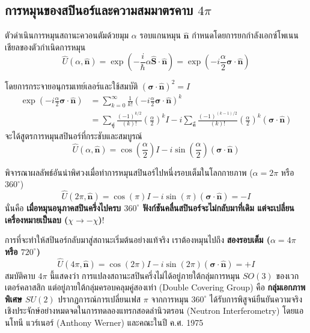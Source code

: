 \subsection{การหมุนของสปินอร์และความสมมาตรคาบ $4\pi$}
ตัวดำเนินการหมุนสถานะควอนตัมด้วยมุม $\alpha$ รอบแกนหมุน $\hat{\mathbf{n}}$ กำหนดโดยการยกกำลังเอกซ์โพเนนเชียลของตัวกำเนิดการหมุน
\begin{equation}
\hat{U}(\alpha, \hat{\mathbf{n}}) = \exp\left( -\frac{i}{\hbar} \alpha \hat{\mathbf{S}}\cdot\hat{\mathbf{n}} \right) = \exp\left( -i \frac{\alpha}{2} \boldsymbol{\sigma}\cdot\hat{\mathbf{n}} \right)
\end{equation}

โดยการกระจายอนุกรมเทย์เลอร์และใช้สมบัติ $(\boldsymbol{\sigma}\cdot\hat{\mathbf{n}})^2 = I$
\begin{align*}
\exp\left( -i \frac{\alpha}{2} \boldsymbol{\sigma}\cdot\hat{\mathbf{n}} \right) &= \sum_{k=0}^\infty \frac{1}{k!} \left( -i\frac{\alpha}{2} \boldsymbol{\sigma}\cdot\hat{\mathbf{n}} \right)^k \\
&= \sum_{\text{คู่}} \frac{(-1)^{k/2}}{(k)!} \left(\frac{\alpha}{2}\right)^k I - i \sum_{\text{คี่}} \frac{(-1)^{(k-1)/2}}{(k)!} \left(\frac{\alpha}{2}\right)^k (\boldsymbol{\sigma}\cdot\hat{\mathbf{n}})
\end{align*}
จะได้สูตรการหมุนสปินอร์ที่กระชับและสมบูรณ์
\begin{equation}
\hat{U}(\alpha, \hat{\mathbf{n}}) = \cos\left(\frac{\alpha}{2}\right) I - i \sin\left(\frac{\alpha}{2}\right) (\boldsymbol{\sigma}\cdot\hat{\mathbf{n}})
\label{eq:spinor_rotation_operator}
\end{equation}

พิจารณาผลลัพธ์อันน่าพิศวงเมื่อทำการหมุนสปินอร์ไปหนึ่งรอบเต็มในโลกกายภาพ ($\alpha = 2\pi$ หรือ $360^\circ$)
\begin{equation}
\hat{U}(2\pi, \hat{\mathbf{n}}) = \cos(\pi) I - i \sin(\pi) (\boldsymbol{\sigma}\cdot\hat{\mathbf{n}}) = -I
\end{equation}
นั่นคือ \textbf{เมื่อหมุนอนุภาคสปินครึ่งไปครบ $360^\circ$ ฟังก์ชันคลื่นสปินอร์จะไม่กลับมาที่เดิม แต่จะเปลี่ยนเครื่องหมายเป็นลบ ($\chi \to -\chi$)}!

การที่จะทำให้สปินอร์กลับมาสู่สถานะเริ่มต้นอย่างแท้จริง เราต้องหมุนไปถึง \textbf{สองรอบเต็ม ($\alpha = 4\pi$ หรือ $720^\circ$)}
\begin{equation}
\hat{U}(4\pi, \hat{\mathbf{n}}) = \cos(2\pi) I - i \sin(2\pi)(\boldsymbol{\sigma}\cdot\hat{\mathbf{n}}) = +I
\end{equation}
สมบัติคาบ $4\pi$ นี้แสดงว่า การแปลงสถานะสปินครึ่งไม่ได้อยู่ภายใต้กลุ่มการหมุน $SO(3)$ ของเวกเตอร์คลาสสิก แต่อยู่ภายใต้กลุ่มครอบคลุมคู่สองเท่า (Double Covering Group) คือ \textbf{กลุ่มเอกภาพพิเศษ $SU(2)$} ปรากฏการณ์การเปลี่ยนเฟส $\pi$ จากการหมุน $360^\circ$ ได้รับการพิสูจน์ยืนยันความจริงเชิงประจักษ์อย่างหมดจดในการทดลองแทรกสอดลำนิวตรอน (Neutron Interferometry) โดยแอนโทนี แวร์เนอร์ (Anthony Werner) และคณะในปี ค.ศ. 1975

